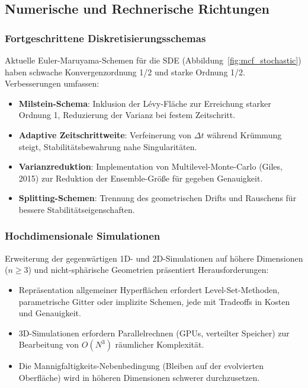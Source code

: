 \documentclass[a4paper,12pt]{article}
\theoremstyle{definition}
\begin{document}
\subsection{Numerische und Rechnerische Richtungen}

\subsubsection{Fortgeschrittene Diskretisierungsschemas}

Aktuelle Euler-Maruyama-Schemen für die SDE (Abbildung~\ref{fig:mcf_stochastic}) haben schwache Konvergenzordnung 1/2 und starke Ordnung 1/2. Verbesserungen umfassen:

\begin{itemize}
	\item \textbf{Milstein-Schema}: Inklusion der Lévy-Fläche zur Erreichung starker Ordnung 1, Reduzierung der Varianz bei festem Zeitschritt.
	\item \textbf{Adaptive Zeitschrittweite}: Verfeinerung von $\Delta t$ während Krümmung steigt, Stabilitätsbewahrung nahe Singularitäten.
	\item \textbf{Varianzreduktion}: Implementation von Multilevel-Monte-Carlo (Giles, 2015) zur Reduktion der Ensemble-Größe für gegeben Genauigkeit.
	\item \textbf{Splitting-Schemen}: Trennung des geometrischen Drifts und Rauschens für bessere Stabilitätseigenschaften.
\end{itemize}

\subsubsection{Hochdimensionale Simulationen}

Erweiterung der gegenwärtigen 1D- und 2D-Simulationen auf höhere Dimensionen ($n \geq 3$) und nicht-sphärische Geometrien präsentiert Herausforderungen:

\begin{itemize}
	\item Repräsentation allgemeiner Hyperflächen erfordert Level-Set-Methoden, parametrische Gitter oder implizite Schemen, jede mit Tradeoffs in Kosten und Genauigkeit.
	\item 3D-Simulationen erfordern Parallelrechnen (GPUs, verteilter Speicher) zur Bearbeitung von $O(N^3)$ räumlicher Komplexität.
	\item Die Mannigfaltigkeits-Nebenbedingung (Bleiben auf der evolvierten Oberfläche) wird in höheren Dimensionen schwerer durchzusetzen.
\end{itemize}
\end{document}
